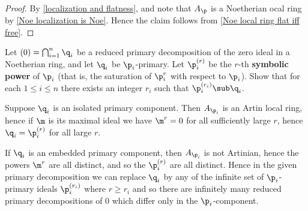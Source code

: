 \begin{proof}
By \cref{localization and flatness}, and note that $A_\p$ is a Noetherian ocal ring by \cref{Noe localization is Noe}. Hence the claim follows from \cref{Noe local ring flat iff free}.
\end{proof}
\begin{exercise}
Let $(0)=\bigcap_{i=1}^{n}\q_i$ be a reduced primary decomposition of the zero ideal in a Noetherian ring, and let $\q_i$ be $\p_i$-primary. Let $\p_i^{(r)}$ be the $r$-th \textbf{symbolic power} of $\p_i$ (that is, the saturation of $\p_i^r$ with respect to $\p_i$). Show that for each $1\leq i\leq n$ there exists an integer $r_i$ such that $
\p_i^{(r_i)}\sub\q_i$.\par
Suppose $\q_i$ is an isolated primary component. Then $A_{\p_i}$ is an Artin local ring, hence if $\m$ is its maximal ideal we have $\m^r=0$ for all sufficiently large $r$, hence $\q_i=\p_i^{(r)}$ for all large $r$.\par
If $\q_i$ is an embedded primary component, then $A_{\p_i}$ is not Artinian, hence the powers $\m^r$ are all distinct, and so the $\p_i^{(r)}$ are all distinct. Hence in the given primary decomposition we can replace $\q_i$ by any of the infinite set of $\p_i$-primary ideals $\p_i^{(r_i)}$ where $r\geq r_i$ and so there are infinitely many reduced primary decompositions of $0$ which differ only in the $\p_i$-component.
\end{exercise}
